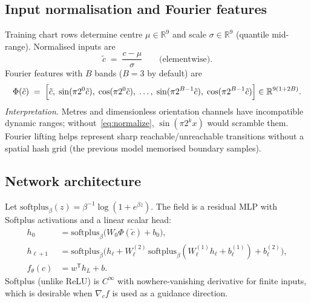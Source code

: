 \documentclass[11pt,a4paper]{article}
\newcommand{\R}{\mathbb{R}}
\begin{document}
\subsection{Input normalisation and Fourier features}
\label{sec:fourier}

Training chart rows determine centre \(\mu\in\R^{9}\) and scale \(\sigma\in\R^{9}\)
(quantile mid-range). Normalised inputs are
\begin{equation}
\label{eq:normalize}
  \tilde c
  \;=\;
  \frac{c-\mu}{\sigma}
  \qquad
  \text{(elementwise)}.
\end{equation}
Fourier features with \(B\) bands (\(B{=}3\) by default) are
\begin{equation}
\label{eq:fourier}
  \Phi(\tilde c)
  \;=\;
  \Bigl[
    \tilde c,\;
    \sin(\pi 2^{0}\tilde c),\;
    \cos(\pi 2^{0}\tilde c),\;
    \ldots,\;
    \sin(\pi 2^{B-1}\tilde c),\;
    \cos(\pi 2^{B-1}\tilde c)
  \Bigr]
  \in\R^{9(1+2B)}.
\end{equation}
\emph{Interpretation.}
Metres and dimensionless orientation channels have incompatible dynamic
ranges; without~\eqref{eq:normalize}, \(\sin(\pi 2^{k}x)\) would scramble
them. Fourier lifting helps represent sharp reachable/unreachable transitions
without a spatial hash grid (the previous model memorised boundary samples).

\subsection{Network architecture}
\label{sec:mlp}

Let \(\mathrm{softplus}_{\beta}(z)=\beta^{-1}\log(1+e^{\beta z})\). The field is
a residual MLP with Softplus activations and a linear scalar head:
\begin{equation}
\label{eq:mlp}
\begin{aligned}
  h_{0}
  &=
  \mathrm{softplus}_{\beta}\bigl(W_{0}\Phi(\tilde c)+b_{0}\bigr),
  \\
  h_{\ell+1}
  &=
  \mathrm{softplus}_{\beta}\bigl(
    h_{\ell}+W_{\ell}^{(2)}\,
    \mathrm{softplus}_{\beta}(W_{\ell}^{(1)}h_{\ell}+b_{\ell}^{(1)})
    +b_{\ell}^{(2)}
  \bigr),
  \\
  f_{\theta}(c)
  &=
  w^{\mathsf T}h_{L}+b.
\end{aligned}
\end{equation}
Softplus (unlike ReLU) is \(C^{\infty}\) with nowhere-vanishing derivative for
finite inputs, which is desirable when \(\nabla_{c}f\) is used as a guidance
direction.
\end{document}
